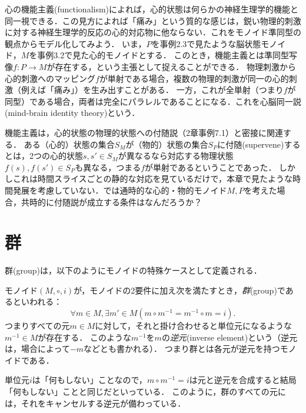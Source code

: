 \documentclass[11pt,a4paper,uplatex]{jsarticle}
\begin{document}
\begin{example}
    心の機能主義(functionalism)によれば，心的状態は何らかの神経生理学的機能と同一視できる．この見方によれば「痛み」という質的な感じは，鋭い物理的刺激に対する神経生理学的反応の心的対応物に他ならない．これをモノイド準同型の観点からモデル化してみよう．
    いま，$P$を事例2.3で見たような脳状態モノイド，$M$を事例3.2で見た心的モノイドとする．
    このとき，機能主義とは準同型写像$f:P \to M$が存在する，という主張として捉えることができる．
    物理刺激から心的刺激へのマッピング$f$が単射である場合，複数の物理的刺激が同一の心的刺激（例えば「痛み」）を生み出すことがある．
    一方，これが全単射（つまり$f$が同型）である場合，両者は完全にパラレルであることになる．これを心脳同一説(mind-brain identity theory)という．
\end{example}

\begin{exercise}
    機能主義は，心的状態の物理的状態への付随説（2章事例7.1）と密接に関連する．
    ある（心的）状態の集合$S_M$が（物的）状態の集合$S_P$に付随(supervene)するとは，2つの心的状態$s, s' \in S_M$が異なるなら対応する物理状態$f(s), f(s') \in S_P$も異なる，つまる$f$が単射であるということであった．
    しかしこれは時間スライスごとの静的な対応を見ているだけで，本章で見たような時間発展を考慮していない．では通時的な心的・物的モノイド$M, P$を考えた場合，共時的に付随説が成立する条件はなんだろうか？
\end{exercise}


\section{群}
群(group)は，以下のようにモノイドの特殊ケースとして定義される．
\begin{dfn}[群]
    モノイド$(M, \circ, i)$が，モノイドの2要件に加え次を満たすとき，\emph{群}(group)であるといわれる：
    \[ \forall m \in M, \exists m' \in M (m \circ m^{-1} = m^{-1} \circ m = i).\]
    つまりすべての元$m \in M$に対して，それと掛け合わせると単位元になるような$m^{-1} \in M$が存在する．
    このような$m^{-1}$を$m$の\emph{逆元}(inverse element)という（逆元は，場合によって$-m$などとも書かれる）．
    つまり群とは各元が逆元を持つモノイドである．
\end{dfn}    

単位元$i$は「何もしない」ことなので，$m \circ m^{-1} = i$は元と逆元を合成すると結局「何もしない」ことと同じだといっている．
このように，群のすべての元には，それをキャンセルする逆元が備わっている．
\end{document}
